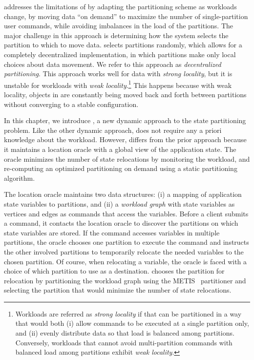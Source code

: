 
\dssmr{} addresses the limitations of \ssmr{} by adapting the partitioning
scheme as workloads change, by moving data ``on demand'' to maximize the number
of single-partition user commands, while avoiding imbalances in the load of the
partitions. The major challenge in this approach is determining how the system
selects the partition to which to move data. \dssmr{} selects partitions
randomly, which allows for a completely decentralized implementation, in which
partitions make only local choices about data movement. We refer to this
approach as \emph{decentralized partitioning}. This approach works well for data
with \emph{strong locality}, but it is unstable for workloads with \emph{weak
locality}.\footnote{Workloads are referred as \emph{strong locality} if that can
be partitioned in a way that would both (i) allow commands to be executed at a
single partition only, and (ii) evenly distribute data so that load is balanced
among partitions. Conversely, workloads that cannot avoid multi-partition
commands with balanced load among partitions exhibit \emph{weak locality}.}
This happens because with weak locality, objects in \dssmr{} are constantly
being moved back and forth between partitions without converging to a stable
configuration.

In this chapter, we introduce \dynastar, a new dynamic approach to the state
partitioning problem. Like the other dynamic approach, \dynastar does not
require any a priori knowledge about the workload. However, \dynastar differs
from the prior approach because it maintains a location oracle with a global
view of the application state. The oracle minimizes the number of state
relocations by monitoring the workload, and re-computing an optimized
partitioning on demand using a static partitioning algorithm.

The location oracle maintains two data structures: (i) a mapping of application
state variables to partitions, and (ii) a \emph{workload graph} with state
variables as vertices and edges as commands that access the variables. Before a
client submits a command, it contacts the location oracle to discover the
partitions on which state variables are stored.  If the command accesses
variables in multiple partitions, the oracle chooses one partition to execute
the command and instructs the other involved partitions to temporarily relocate
the needed variables to the chosen partition. Of course, when relocating a
variable, the oracle is faced with a choice of which partition to use as a
destination. \dynastar chooses the partition for relocation by partitioning the
workload graph using the METIS~\cite{abou2006multilevel} partitioner and selecting
the partition that would minimize the number of state relocations.

